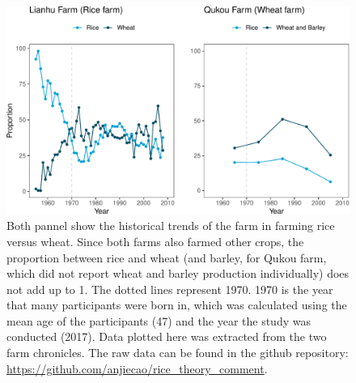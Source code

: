 \documentclass[
  man]{apa6}
\begin{document}
\begin{figure}
\centering
\includegraphics{comment_files/figure-latex/unnamed-chunk-2-1.pdf}
\caption{\label{fig:unnamed-chunk-2}Both pannel show the historical trends of the farm in farming rice versus wheat. Since both farms also farmed other crops, the proportion between rice and wheat (and barley, for Qukou farm, which did not report wheat and barley production individually) does not add up to 1. The dotted lines represent 1970. 1970 is the year that many participants were born in, which was calculated using the mean age of the participants (47) and the year the study was conducted (2017). Data plotted here was extracted from the two farm chronicles. The raw data can be found in the github repository: \url{https://github.com/anjiecao/rice_theory_comment}.}
\end{figure}
\end{document}

